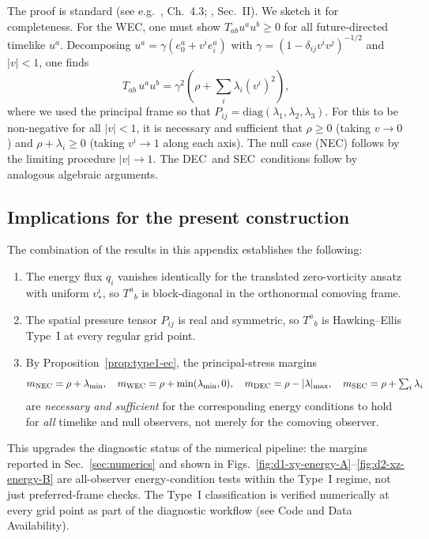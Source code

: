 \documentclass[11pt]{article}
\makeatletter
\newcommand{\@abbr}[1]{\ifmmode\mathrm{#1}\else\textsc{#1}\fi}
\newcommand{\WEC}{\@abbr{WEC}}
\newcommand{\NEC}{\@abbr{NEC}}
\newcommand{\SEC}{\@abbr{SEC}}
\newcommand{\DEC}{\@abbr{DEC}}
\makeatother
\begin{document}
\noindent The proof is standard (see e.g.\ \cite{HawkingEllis1973}, Ch.~4.3; \cite{MartinMoruno:2017exc}, Sec.~II). We sketch it for completeness. For the \WEC, one must show $T_{ab}u^a u^b \ge 0$ for all future-directed timelike $u^a$. Decomposing $u^a = \gamma(e_0^a + v^i e_i^a)$ with $\gamma = (1-\delta_{ij}v^iv^j)^{-1/2}$ and $|v|<1$, one finds
\begin{equation}
T_{ab}\,u^a u^b = \gamma^2\!\left(\rho + \sum_i \lambda_i (v^i)^2\right),
\end{equation}
where we used the principal frame so that $P_{ij} = \mathrm{diag}(\lambda_1,\lambda_2,\lambda_3)$. For this to be non-negative for all $|v|<1$, it is necessary and sufficient that $\rho \ge 0$ (taking $v\to 0$) and $\rho + \lambda_i \ge 0$ (taking $v^i \to 1$ along each axis). The null case (\NEC) follows by the limiting procedure $|v|\to 1$. The \DEC\ and \SEC\ conditions follow by analogous algebraic arguments.

\subsection{Implications for the present construction}

The combination of the results in this appendix establishes the following:

\begin{enumerate}
\item The energy flux $q_i$ vanishes identically for the translated zero-vorticity ansatz with uniform $v_*^i$, so $T^a{}_b$ is block-diagonal in the orthonormal comoving frame.
\item The spatial pressure tensor $P_{ij}$ is real and symmetric, so $T^a{}_b$ is Hawking--Ellis Type~I at every regular grid point.
\item By Proposition~\ref{prop:type1-ec}, the principal-stress margins
\begin{equation}
m_\NEC = \rho + \lambda_{\min},\quad m_\WEC = \rho + \min(\lambda_{\min},0),\quad m_\DEC = \rho - |\lambda|_{\max},\quad m_\SEC = \rho + \textstyle\sum_i\lambda_i
\end{equation}
are \emph{necessary and sufficient} for the corresponding energy conditions to hold for \emph{all} timelike and null observers, not merely for the comoving observer.
\end{enumerate}

This upgrades the diagnostic status of the numerical pipeline: the margins reported in Sec.~\ref{sec:numerics} and shown in Figs.~\ref{fig:d1-xy-energy-A}--\ref{fig:d2-xz-energy-B} are all-observer energy-condition tests within the Type~I regime, not just preferred-frame checks. The Type~I classification is verified numerically at every grid point as part of the diagnostic workflow (see Code and Data Availability).




\end{document}
